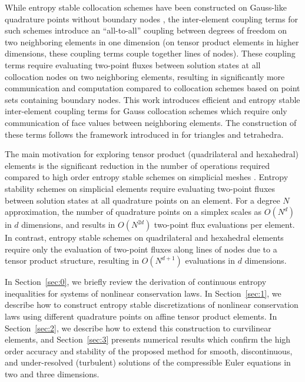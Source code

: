 \documentclass[onefignum,onetabnum,final]{siamart171218}
\begin{document}
While entropy stable collocation schemes have been constructed on Gauss-like quadrature points without boundary nodes \cite{crean2017high}, the inter-element coupling terms for such schemes introduce an ``all-to-all'' coupling between degrees of freedom on two neighboring elements in one dimension (on tensor product elements in higher dimensions, these coupling terms couple together lines of nodes).  These coupling terms require evaluating two-point fluxes between solution states at all collocation nodes on two neighboring elements, resulting in significantly more communication and computation compared to collocation schemes based on point sets containing boundary nodes.  This work introduces efficient and entropy stable inter-element coupling terms for Gauss collocation schemes which require only communication of face values between neighboring elements.  The construction of these terms follows the framework introduced in \cite{chan2017discretely, chan2018discretely} for triangles and tetrahedra.  

The main motivation for exploring tensor product (quadrilateral and hexahedral) elements is the significant reduction in the number of operations required compared to high order entropy stable schemes on simplicial meshes \cite{chan2017discretely, chan2018discretely}.  Entropy stability schemes on simplicial elements require evaluating two-point fluxes between solution states at all quadrature points on an element.  For a degree $N$ approximation, the number of quadrature points on a simplex scales as $O(N^d)$ in $d$ dimensions, and results in $O(N^{2d})$ two-point flux evaluations per element.  In contrast, entropy stable schemes on quadrilateral and hexahedral elements require only the evaluation of two-point fluxes along lines of nodes due to a tensor product structure, resulting in $O(N^{d+1})$ evaluations in $d$ dimensions.  

In Section~\ref{sec:0}, we briefly review the derivation of continuous entropy inequalities for systems of nonlinear conservation laws.  In Section~\ref{sec:1}, we describe how to construct entropy stable discretizations of nonlinear conservation laws using different quadrature points on affine tensor product elements.  In Section~\ref{sec:2}, we describe how to extend this construction to curvilinear elements, and Section~\ref{sec:3} presents numerical results which confirm the high order accuracy and stability of the proposed method for smooth, discontinuous, and under-resolved (turbulent) solutions of the compressible Euler equations in two and three dimensions.  
\end{document}
